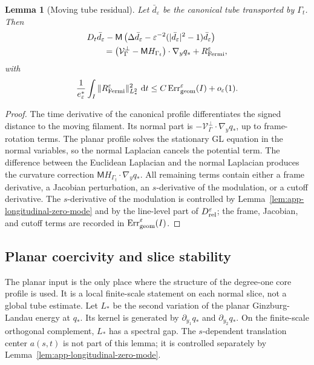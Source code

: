 \documentclass[11pt]{article}
\newtheorem{lemma}[theorem]{Lemma}
\theoremstyle{definition}
\newcommand{\dd}{\,\mathrm d}
\newcommand{\eps}{\varepsilon}
\newcommand{\estar}{e_\varepsilon^\ast}
\newcommand{\Mmob}{\mathsf M}
\newcommand{\Vrel}{\mathcal V}
\begin{document}
\begin{lemma}[Moving tube residual]
\label{lem:app-moving-tube-residual}
Let \(\bar d_\eps\) be the canonical tube transported by
\(\Gamma_t\).  Then
\[
\begin{aligned}
&D_t\bar d_\eps
        -
        \Mmob\left(\Delta\bar d_\eps
        -
        \eps^{-2}(|\bar d_\eps|^2-1)\bar d_\eps\right)
\\
&\qquad=
        \bigl(
        \Vrel_\Gamma^\perp-\Mmob H_{\Gamma_t}
        \bigr)\cdot\nabla_yq_\ast
        +
        R_{\rm Fermi}^\eps ,
\end{aligned}
\]
with
\[
        \frac1{\estar}
        \int_I\|R_{\rm Fermi}^\eps\|_{L_\ast^2}^2\,\dd t
        \le
        C\,{\rm Err}_{\rm geom}^\eps(I)+o_\eps(1).
\]
\end{lemma}

\begin{proof}
The time derivative of the canonical profile differentiates the signed
distance to the moving filament.  Its normal part is
\(-\Vrel_\Gamma^\perp\cdot\nabla_yq_\ast\), up to frame-rotation terms.  The planar
profile solves the stationary GL equation in the normal variables, so the
normal Laplacian cancels the potential term.  The difference between the
Euclidean Laplacian and the normal Laplacian produces the curvature correction
\(\Mmob H_{\Gamma_t}\cdot\nabla_yq_\ast\).  All remaining terms contain either
a frame derivative, a Jacobian perturbation, an \(s\)-derivative of the
modulation, or a cutoff derivative.  The \(s\)-derivative of the modulation is
controlled by Lemma~\ref{lem:app-longitudinal-zero-mode} and by the line-level
part of \(D_{\rm rel}^\eps\); the frame, Jacobian, and cutoff terms are recorded
in \({\rm Err}_{\rm geom}^\eps(I)\).
\end{proof}

\subsection{Planar coercivity and slice stability}

The planar input is the only place where the structure of the degree-one core
profile is used.  It is a local finite-scale statement on each normal slice,
not a global tube estimate.  Let \(L_\ast\) be the second variation of the
planar Ginzburg-Landau energy at \(q_\ast\).  Its kernel is generated by
\(\partial_{y_1}q_\ast\) and \(\partial_{y_2}q_\ast\).  On the finite-scale
orthogonal complement, \(L_\ast\) has a spectral gap.  The \(s\)-dependent
translation center \(a(s,t)\) is not part of this lemma; it is controlled
separately by Lemma~\ref{lem:app-longitudinal-zero-mode}.
\end{document}
